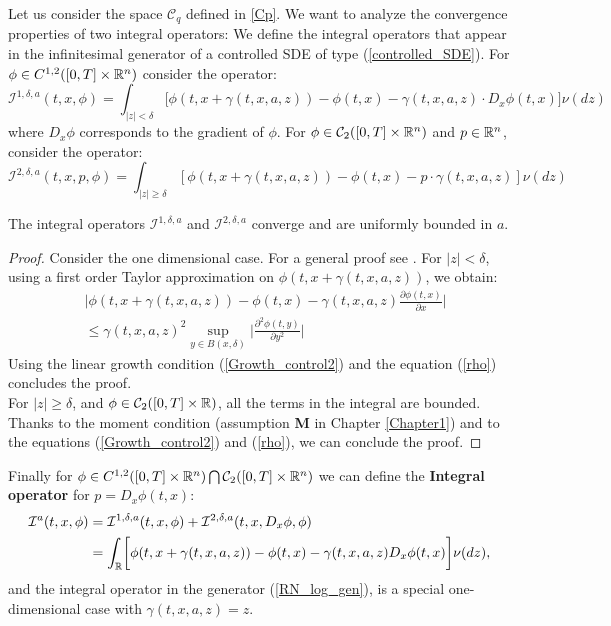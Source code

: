 Let us consider the space $\mathcal{C}_q$ defined in \ref{Cp}. We want to analyze the convergence properties of two integral operators:
We define the integral operators that appear in the infinitesimal generator of a controlled SDE of type (\ref{controlled_SDE}).
For $\phi \in C^{1,2}([0,T] \times \mathbb{R}^n) $ consider the operator:  
\begin{equation}
 \mathcal{I}^{1,\delta,a}(t,x,\phi) = \int_{|z|<\delta}
\biggl[ \phi(t,x + \gamma(t,x,a,z)) - \phi(t,x) - \gamma(t,x,a,z) \cdot D_x \phi(t,x) \biggr] \nu(dz)
\end{equation}
where $D_x \phi$ corresponds to the gradient of $\phi$.
For $\phi \in \mathcal{C}_2([0,T] \times \mathbb{R}^n) $ and $p \in \mathbb{R}^n$, consider the operator:
\begin{equation}
\mathcal{I}^{2,\delta,a}(t,x,p,\phi) = \int_{|z|\geq \delta}
[ \phi(t,x+ \gamma(t,x,a,z)) - \phi(t,x) - p \cdot \gamma(t,x,a,z)] \nu(dz)
\end{equation}
\begin{Theorem}
 The integral operators $\mathcal{I}^{1,\delta,a}$ and $\mathcal{I}^{2,\delta,a}$ converge and are uniformly bounded in $a$.
\end{Theorem}
\begin{proof}
 Consider the one dimensional case. For a general proof see \cite{Ph98}.
 For $|z|<\delta$, using a first order Taylor approximation on $\phi(t,x + \gamma(t,x,a,z))$, we obtain:
 \begin{align*}
 & \bigg|\phi(t,x + \gamma(t,x,a,z)) - \phi(t,x) - \gamma(t,x,a,z) \frac{\partial \phi(t,x)}{\partial x} \bigg| \\ 
 & \leq \gamma(t,x,a,z)^2 \sup_{y \in B(x,\delta)} \bigg| \frac{\partial^2 \phi(t,y)}{\partial y^2}\bigg| 
 \end{align*}
 Using the linear growth condition (\ref{Growth_control2}) and the equation (\ref{rho}) concludes the proof.\\
 For $|z|\geq \delta$, and $\phi \in \mathcal{C}_2([0,T] \times \mathbb{R}) $, all the terms in the integral are bounded. Thanks to the moment condition (assumption \textbf{M} 
 in Chapter \ref{Chapter1}) and to the equations (\ref{Growth_control2}) and (\ref{rho}), we can conclude the proof.
\end{proof}
Finally for $\phi \in C^{1,2}([0,T] \times \mathbb{R}^n) \bigcap \mathcal{C}_2([0,T] \times \mathbb{R}^n)$ we can define the 
\textbf{Integral operator} for $p=D_x \phi(t,x)$:
\begin{align}\label{int_oper}
 \mathcal{I}^{a}(t,x,\phi) &= \mathcal{I}^{1,\delta,a}(t,x,\phi) + \mathcal{I}^{2,\delta,a}(t,x,D_x \phi,\phi)\\ \nonumber
 &= \int_{\mathbb{R}}
\biggl[ \phi(t,x + \gamma(t,x,a,z)) - \phi(t,x) - \gamma(t,x,a,z) D_x \phi(t,x) \biggr] \nu(dz), 
\end{align}
and the integral operator in the generator (\ref{RN_log_gen}), is a special one-dimensional case with $\gamma(t,x,a,z) = z$.

